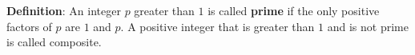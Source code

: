 
{\bf Definition}:  An integer $p$ greater than $1$ is called {\bf prime} if the only positive factors of 
$p$ are $1$ and $p$. A positive integer that is greater than $1$ and is not prime is called composite. 
